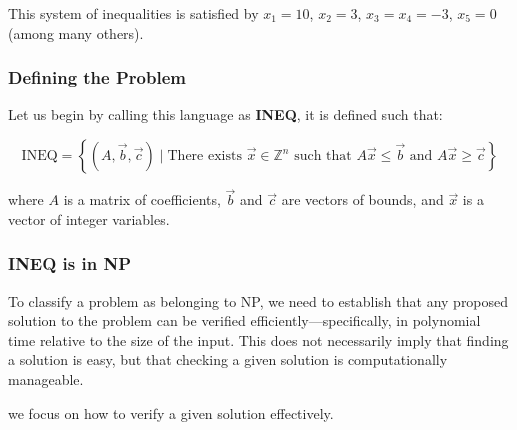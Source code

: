 \documentclass{article}
\begin{document}
This system of inequalities is satisfied by \(x_1 = 10\), \(x_2 = 3\), \(x_3 = x_4 = -3\), \(x_5 = 0\) (among many others).

\subsubsection*{Defining the Problem}
Let us begin by calling this language as \textbf{INEQ}, it is defined such that:

\[
\text{INEQ} = \left\{ (A, \vec{b}, \vec{c}) \mid \text{There exists } \vec{x} \in \mathbb{Z}^n \text{ such that } A\vec{x} \leq \vec{b} \text{ and } A\vec{x} \geq \vec{c} \right\}
\]

where \( A \) is a matrix of coefficients, \( \vec{b} \) and \( \vec{c} \) are vectors of bounds, and \( \vec{x} \) is a vector of integer variables.




\subsubsection*{ INEQ is in NP}
To classify a problem as belonging to NP, we need to establish that any proposed solution to the problem can be verified efficiently—specifically, in polynomial time relative to the size of the input. This does not necessarily imply that finding a solution is easy, but that checking a given solution is computationally manageable.

we focus on how to verify a given solution effectively.
\end{document}
